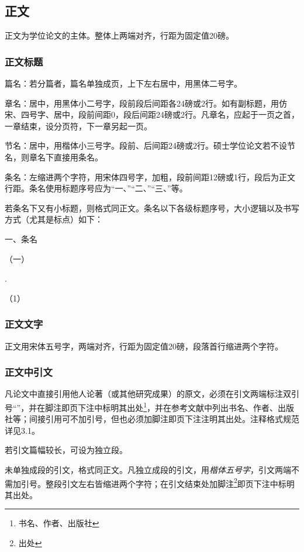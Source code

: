 \subsection{正文}

正文为学位论文的主体。整体上两端对齐，行距为固定值20磅。

\subsubsection{正文标题}

篇名：若分篇者，篇名单独成页，上下左右居中，用黑体二号字。

章名：居中，用黑体小二号字，段前段后间距各24磅或2行。如有副标题，用仿宋、四号字、居中，段前间距0，段后间距24磅或2行。凡章名，应起于一页之首，一章结束，设分页符，下一章另起一页。

节名：居中，用楷体小三号字。段前、后间距24磅或2行。硕士学位论文若不设节名，则章名下直接用条名。

条名：左缩进两个字符，用宋体四号字，加粗，段前间距12磅或1行，段后为正文行距。条名使用标题序号应为“一、”“二、”“三、”等。

若条名下又有小标题，则格式同正文。条名以下各级标题序号，大小逻辑以及书写方式（尤其是标点）如下：

一、条名

\indent\indent （一）

\indent{}.

\indent\indent （1）

\subsubsection{正文文字}

正文用宋体五号字，两端对齐，行距为固定值20磅，段落首行缩进两个字符。

\subsubsection{正文中引文}

凡论文中直接引用他人论著（或其他研究成果）的原文，必须在引文两端标注双引号“”，并在脚注即页下注中标明其出处\footnote{书名、作者、出版社}，并在参考文献中列出书名、作者、出版社等；间接引用可不加引号，但也必须加脚注即页下注注明其出处。注释格式规范详见3.1。

若引文篇幅较长，可设为独立段。

未单独成段的引文，格式同正文。凡独立成段的引文，用\textit{楷体五号字}，引文两端不需加引号。整段引文左右皆缩进两个字符；在引文结束处加脚注\footnote{出处}即页下注中标明其出处。

